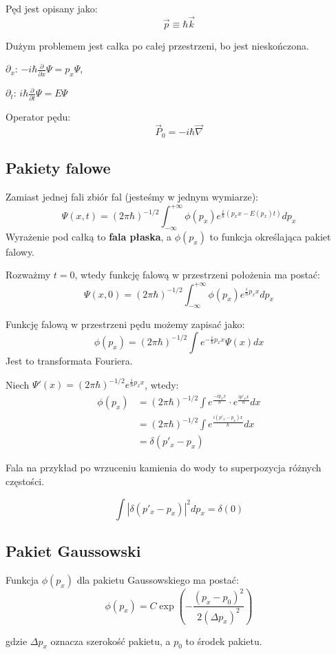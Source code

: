 Pęd jest opisany jako:
\[
\vec{p} \equiv \hbar \vec{k}
\]

Dużym problemem jest całka po całej przestrzeni, bo jest nieskończona.

$\partial_x$: $-i\hbar \frac{\partial}{\partial x} \Psi = p_x \Psi$,

$\partial_t$: $i\hbar \frac{\partial}{\partial t} \Psi = E \Psi$

Operator pędu:
\[
\vec{P}_0 = -i\hbar \vec{\nabla}
\]

\subsection{Pakiety falowe}
Zamiast jednej fali zbiór fal (jesteśmy w jednym wymiarze):
\[
\Psi(x,t) = (2\pi\hbar)^{-1/2} \int_{-\infty}^{+\infty} \phi(p_x) e^{\frac{i}{\hbar} (p_x x - E(p_x) t)} dp_x
\]
Wyrażenie pod całką to \textbf{fala płaska}, a $\phi(p_x)$ to funkcja określająca pakiet falowy.

Rozważmy $t = 0$, wtedy funkcję falową w przestrzeni położenia ma postać:
\[
\Psi(x,0) = (2\pi\hbar)^{-1/2} \int_{-\infty}^{+\infty} \phi(p_x) e^{\frac{i}{\hbar} p_x x} dp_x
\]

Funkcję falową w przestrzeni pędu możemy zapisać jako:
\[
\phi(p_x) = (2\pi\hbar)^{-1/2} \int e^{-\frac{i}{\hbar} p_x x} \Psi(x) dx
\]
Jest to transformata Fouriera.

Niech $\Psi'(x) = (2\pi\hbar)^{-1/2} e^{\frac{i}{\hbar} p_x x}$, wtedy:
\begin{align*}
\phi(p_x) &= (2\pi\hbar)^{-1/2} \int e^\frac{-ip_x x}{\hbar} \cdot e^\frac{ip'_x x}{\hbar} dx \\
&= (2\pi\hbar)^{-1/2} \int e^\frac{i(p'_x - p_x) x}{\hbar} dx \\
&= \delta(p'_x - p_x)
\end{align*}

Fala na przykład po wrzuceniu kamienia do wody to superpozycja różnych częstości.

\[
\int |\delta(p'_x - p_x)|^2 dp_x = \delta(0)
\]

\subsection{Pakiet Gaussowski}
Funkcja $\phi(p_x)$ dla pakietu Gaussowskiego ma postać:
\[
\phi(p_x) = C \exp \left( -\frac{(p_x - p_0)^2}{2 (\Delta p_x)^2} \right)
\]

gdzie $\Delta p_x$ oznacza szerokość pakietu, a $p_0$ to środek pakietu.

